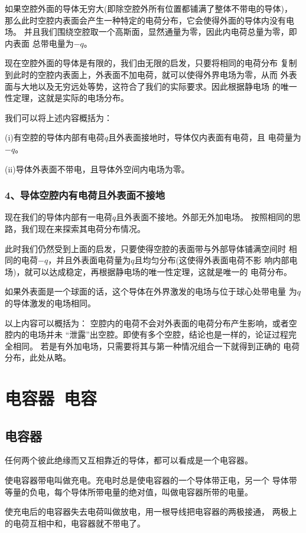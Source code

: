 如果空腔外面的导体无穷大(即除空腔外所有位置都铺满了整体不带电的导体)，
那么此时空腔内表面会产生一种特定的电荷分布，它会使得外面的导体内没有电场。
并且我们围绕空腔取一个高斯面，显然通量为零，因此内电荷总量为零，即内表面
总带电量为$-q$。

现在空腔外面的导体是有限的，我们由无限的启发，只要将相同的电荷分布
复制到此时的空腔内表面上，外表面不加电荷，就可以使得外界电场为零，从而 
外表面与大地以及无穷远处等势，这符合了我们的实际要求。因此根据静电场
的唯一性定理，这就是实际的电场分布。

我们可以将上述内容概括为：

(i)有空腔的导体内部有电荷$q$且外表面接地时，导体仅内表面有电荷，且 
电荷量为$-q$。

(ii)导体外表面不带电，且导体外空间内电场为零。
\subsubsection*{4、导体空腔内有电荷且外表面不接地}
现在我们的导体内部有一电荷$q$且外表面不接地。外部无外加电场。
按照相同的思路，我们现在来探索其电荷分布情况。

此时我们仍然受到上面的启发，只要使得空腔的表面带与外部导体铺满空间时
相同的电荷$-q$，并且外表面电荷量为$q$且均匀分布(这使得外表面电荷不影
响内部电场)，就可以达成稳定，再根据静电场的唯一性定理，这就是唯一的
电荷分布。

如果外表面是一个球面的话，这个导体在外界激发的电场与位于球心处带电量
为$q$的导体激发的电场相同。

以上内容可以概括为：
空腔内的电荷不会对外表面的电荷分布产生影响，或者空腔内的电场并未
“泄露”出空腔。即使有多个空腔，结论也是一样的，论证过程完全相同。
若是有外加电场，只需要将其与第一种情况组合一下就得到正确的
电荷分布，此处从略。
\section{电容器~电容}
\subsection{电容器}
\begin{definition}
    任何两个彼此绝缘而又互相靠近的导体，都可以看成是一个电容器。
\end{definition}

\begin{definition}
    使电容器带电叫做充电。充电时总是使电容器的一个导体带正电，另一个
    导体带等量的负电，每个导体所带电量的绝对值，叫做电容器所带的电量。
    
    使充电后的电容器失去电荷叫做放电，用一根导线把电容器的两极接通，
    两极上的电荷互相中和，电容器就不带电了。
\end{definition}


